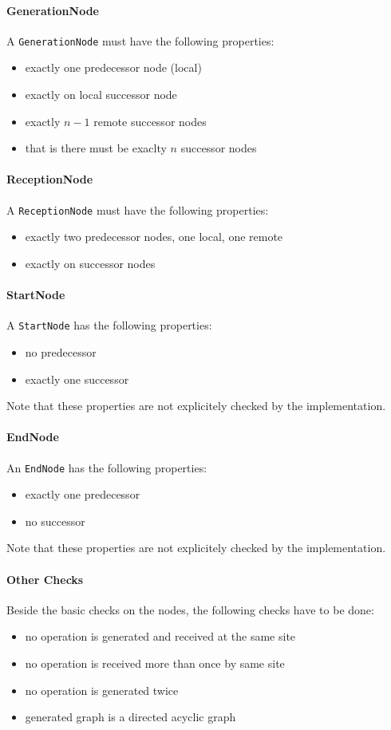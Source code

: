 \documentclass[11pt,a4paper]{article}
\begin{document}
\paragraph{GenerationNode}
A \texttt{GenerationNode} must have the following properties:
\begin{itemize}
 \item exactly one predecessor node (local)
 \item exactly on local successor node
 \item exactly $n - 1$ remote successor nodes
 \item that is there must be exaclty $n$ successor nodes
\end{itemize}

\paragraph{ReceptionNode}
A \texttt{ReceptionNode} must have the following properties:
\begin{itemize}
 \item exactly two predecessor nodes, one local, one remote
 \item exactly on successor nodes
\end{itemize}

\paragraph{StartNode}
A \texttt{StartNode} has the following properties:
\begin{itemize}
 \item no predecessor
 \item exactly one successor
\end{itemize}
Note that these properties are not explicitely checked by the implementation.

\paragraph{EndNode}
An \texttt{EndNode} has the following properties:
\begin{itemize}
 \item exactly one predecessor
 \item no successor
\end{itemize}
Note that these properties are not explicitely checked by the implementation.

\paragraph{Other Checks}
Beside the basic checks on the nodes, the following checks have to be done:
\begin{itemize}
 \item no operation is generated and received at the same site
 \item no operation is received more than once by same site
 \item no operation is generated twice
 \item generated graph is a directed acyclic graph
\end{itemize}
\end{document}
